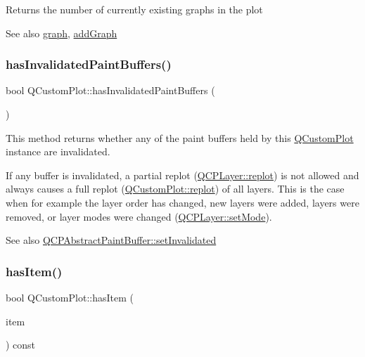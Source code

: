 Returns the number of currently existing graphs in the plot

\begin{DoxySeeAlso}{See also}
\hyperlink{classQCustomPlot_a6ecae130f684b25276fb47bd3a5875c6}{graph}, \hyperlink{classQCustomPlot_a6fb2873d35a8a8089842d81a70a54167}{add\+Graph} 
\end{DoxySeeAlso}
\mbox{\label{classQCustomPlot_ad452b582348c8e99462d83fe1cd0279b}} 
\subsubsection{\texorpdfstring{has\+Invalidated\+Paint\+Buffers()}{hasInvalidatedPaintBuffers()}}
{\footnotesize\ttfamily bool Q\+Custom\+Plot\+::has\+Invalidated\+Paint\+Buffers (\begin{DoxyParamCaption}{ }\end{DoxyParamCaption})\hspace{0.3cm}{\ttfamily [protected]}}

This method returns whether any of the paint buffers held by this \hyperlink{classQCustomPlot}{Q\+Custom\+Plot} instance are invalidated.

If any buffer is invalidated, a partial replot (\hyperlink{classQCPLayer_adefd53b6db02f470151c416f42e37180}{Q\+C\+P\+Layer\+::replot}) is not allowed and always causes a full replot (\hyperlink{classQCustomPlot_aa4bfe7d70dbe67e81d877819b75ab9af}{Q\+Custom\+Plot\+::replot}) of all layers. This is the case when for example the layer order has changed, new layers were added, layers were removed, or layer modes were changed (\hyperlink{classQCPLayer_a938d57b04f4e4c23cedf1711f983919b}{Q\+C\+P\+Layer\+::set\+Mode}).

\begin{DoxySeeAlso}{See also}
\hyperlink{classQCPAbstractPaintBuffer_ae4c7dc70dfc66be2879ce297b2b3d67f}{Q\+C\+P\+Abstract\+Paint\+Buffer\+::set\+Invalidated} 
\end{DoxySeeAlso}
\mbox{\label{classQCustomPlot_af0b57f35646079f93fa6161a65b36109}} 
\subsubsection{\texorpdfstring{has\+Item()}{hasItem()}}
{\footnotesize\ttfamily bool Q\+Custom\+Plot\+::has\+Item (\begin{DoxyParamCaption}\item[{\hyperlink{classQCPAbstractItem}{Q\+C\+P\+Abstract\+Item} $\ast$}]{item }\end{DoxyParamCaption}) const}

